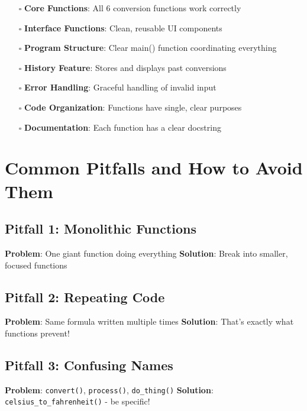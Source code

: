 \documentclass[
  letterpaper,
  DIV=11,
  numbers=noendperiod,
  oneside]{scrreprt}
\providecommand{\tightlist}{%
  \setlength{\itemsep}{0pt}\setlength{\parskip}{0pt}}\usepackage{longtable,booktabs,array}
\begin{document}
\begin{itemize}
\tightlist
\item[$\square$]
  \textbf{Core Functions}: All 6 conversion functions work correctly
\item[$\square$]
  \textbf{Interface Functions}: Clean, reusable UI components
\item[$\square$]
  \textbf{Program Structure}: Clear main() function coordinating
  everything
\item[$\square$]
  \textbf{History Feature}: Stores and displays past conversions
\item[$\square$]
  \textbf{Error Handling}: Graceful handling of invalid input
\item[$\square$]
  \textbf{Code Organization}: Functions have single, clear purposes
\item[$\square$]
  \textbf{Documentation}: Each function has a clear docstring
\end{itemize}

\section{Common Pitfalls and How to Avoid
Them}\label{common-pitfalls-and-how-to-avoid-them-4}

\subsection{Pitfall 1: Monolithic
Functions}\label{pitfall-1-monolithic-functions}

\textbf{Problem}: One giant function doing everything \textbf{Solution}:
Break into smaller, focused functions

\subsection{Pitfall 2: Repeating Code}\label{pitfall-2-repeating-code}

\textbf{Problem}: Same formula written multiple times \textbf{Solution}:
That's exactly what functions prevent!

\subsection{Pitfall 3: Confusing Names}\label{pitfall-3-confusing-names}

\textbf{Problem}: \texttt{convert()}, \texttt{process()},
\texttt{do\_thing()} \textbf{Solution}:
\texttt{celsius\_to\_fahrenheit()} - be specific!
\end{document}
